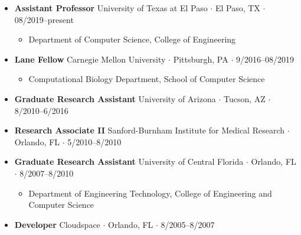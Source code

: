 \documentclass[10pt,letterpaper]{article}
\newcommand{\bigdot}{$\cdot$\xspace}
\begin{document}
\begin{itemize}[leftmargin=*,labelindent=5pt,itemindent=-15pt]
\item \textbf{Assistant Professor}
University of Texas at El Paso \bigdot El Paso, TX \bigdot 08/2019--present
\begin{itemize}
	\item Department of Computer Science, College of Engineering
\end{itemize}


\item \textbf{Lane Fellow}
Carnegie Mellon University \bigdot Pittsburgh, PA \bigdot 9/2016--08/2019
\begin{itemize}
    \item Computational Biology Department, School of Computer Science
\end{itemize}

\item \textbf{Graduate Research Assistant}
University of Arizona \bigdot Tucson, AZ \bigdot 8/2010--6/2016 

\item \textbf{Research Associate II}
Sanford-Burnham Institute for Medical Research \bigdot Orlando, FL \bigdot 5/2010--8/2010 

\item \textbf{Graduate Research Assistant}
University of Central Florida \bigdot Orlando, FL \bigdot 8/2007--8/2010 
\begin{itemize}
    \item Department of Engineering Technology, College of Engineering and Computer Science
\end{itemize}

\item \textbf{Developer}
Cloudspace \bigdot Orlando, FL \bigdot 8/2005--8/2007 
\end{itemize}
\end{document}
